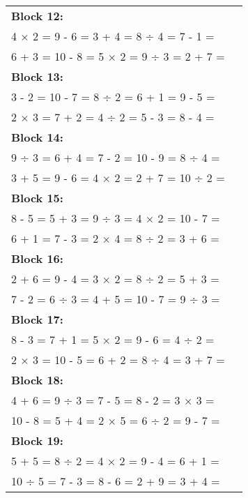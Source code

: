 \documentclass[a4paper,12pt]{scrartcl}
\begin{document}
\begin{adjustbox}{center, valign=c}
\begin{tabular}{@{}p{0.95\linewidth}@{}}

\textbf{Block 12:}\\
4 × 2 = \hfill 9 - 6 = \hfill 3 + 4 = \hfill 8 ÷ 4 = \hfill 7 - 1 =\\
6 + 3 = \hfill 10 - 8 = \hfill 5 × 2 = \hfill 9 ÷ 3 = \hfill 2 + 7 =\\[0.6em]

\textbf{Block 13:}\\
3 - 2 = \hfill 10 - 7 = \hfill 8 ÷ 2 = \hfill 6 + 1 = \hfill 9 - 5 =\\
2 × 3 = \hfill 7 + 2 = \hfill 4 ÷ 2 = \hfill 5 - 3 = \hfill 8 - 4 =\\[0.6em]

\textbf{Block 14:}\\
9 ÷ 3 = \hfill 6 + 4 = \hfill 7 - 2 = \hfill 10 - 9 = \hfill 8 ÷ 4 =\\
3 + 5 = \hfill 9 - 6 = \hfill 4 × 2 = \hfill 2 + 7 = \hfill 10 ÷ 2 =\\[0.6em]

\textbf{Block 15:}\\
8 - 5 = \hfill 5 + 3 = \hfill 9 ÷ 3 = \hfill 4 × 2 = \hfill 10 - 7 =\\
6 + 1 = \hfill 7 - 3 = \hfill 2 × 4 = \hfill 8 ÷ 2 = \hfill 3 + 6 =\\[0.6em]

\textbf{Block 16:}\\
2 + 6 = \hfill 9 - 4 = \hfill 3 × 2 = \hfill 8 ÷ 2 = \hfill 5 + 3 =\\
7 - 2 = \hfill 6 ÷ 3 = \hfill 4 + 5 = \hfill 10 - 7 = \hfill 9 ÷ 3 =\\[0.6em]

\textbf{Block 17:}\\
8 - 3 = \hfill 7 + 1 = \hfill 5 × 2 = \hfill 9 - 6 = \hfill 4 ÷ 2 =\\
2 × 3 = \hfill 10 - 5 = \hfill 6 + 2 = \hfill 8 ÷ 4 = \hfill 3 + 7 =\\[0.6em]

\textbf{Block 18:}\\
4 + 6 = \hfill 9 ÷ 3 = \hfill 7 - 5 = \hfill 8 - 2 = \hfill 3 × 3 =\\
10 - 8 = \hfill 5 + 4 = \hfill 2 × 5 = \hfill 6 ÷ 2 = \hfill 9 - 7 =\\[0.6em]

\textbf{Block 19:}\\
5 + 5 = \hfill 8 ÷ 2 = \hfill 4 × 2 = \hfill 9 - 4 = \hfill 6 + 1 =\\
10 ÷ 5 = \hfill 7 - 3 = \hfill 8 - 6 = \hfill 2 + 9 = \hfill 3 + 4 =\\[0.6em]


\end{tabular}
\end{adjustbox}
\end{document}
